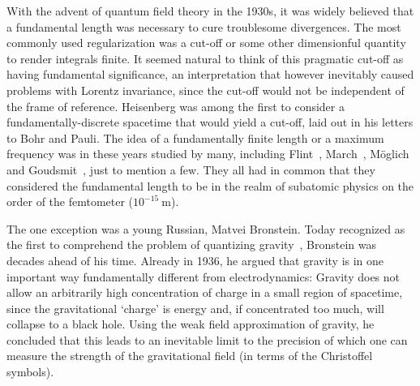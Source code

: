 \documentclass{article}
\begin{document}
With the advent of quantum 
field theory in the 1930s, it was widely believed that a fundamental length was necessary to cure 
troublesome divergences. The most commonly
used regularization was a cut-off or some other dimensionful quantity to render integrals finite.
It seemed natural to think of this pragmatic cut-off as having fundamental significance, an interpretation
that however inevitably caused problems with Lorentz invariance, since the cut-off would not be
independent of the frame of reference. Heisenberg was among the first to consider a
fundamentally-discrete spacetime that would yield a cut-off, laid out in his letters to Bohr and Pauli. The idea of a fundamentally finite 
length or a maximum frequency was in these years studied by many, including Flint~\cite{Flint}, March~\cite{March}, 
M\"oglich~\cite{Moglich}
and Goudsmit~\cite{Goudsmit}, just to mention a few. They all had in common that they considered the
fundamental length to be in the realm of subatomic physics on the
order of the femtometer ($10^{-15}\mathrm{\ m}$). 

The one exception was a young Russian, Matvei Bronstein. Today recognized as
the first to comprehend the problem of quantizing gravity~\cite{Bronstein}, Bronstein was decades 
ahead of his time. Already in 1936, he argued that gravity is in one important way fundamentally
different from electrodynamics: Gravity does not allow an arbitrarily high
 concentration of charge in a small region of spacetime, since the gravitational `charge' is 
energy and, if concentrated too much, will collapse to a black hole. Using the weak field approximation
of gravity, he concluded that this leads to an inevitable limit to the precision of which one
can measure the strength of the gravitational field (in terms of the Christoffel symbols). 
\end{document}
